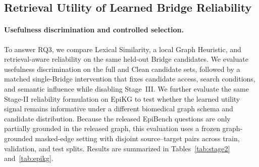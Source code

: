 \documentclass{article} %
\begin{document}
\subsection{Retrieval Utility of Learned Bridge Reliability}
\label{sec:stage2_eval}

\paragraph{Usefulness discrimination and controlled selection.}
To answer RQ3, we compare Lexical Similarity, a local Graph Heuristic, and
retrieval-aware reliability on the same held-out Bridge candidates. We evaluate
usefulness discrimination on the full and Clean candidate sets, followed by a
matched single-Bridge intervention that fixes candidate access, search conditions,
and semantic influence while disabling Stage~III. We further evaluate the same
Stage-II reliability formulation on EpiKG to test whether the learned utility signal
remains informative under a different biomedical graph schema and candidate
distribution. Because the released EpiBench questions are only partially grounded
in the released graph, this evaluation uses a frozen graph-grounded masked-edge
setting with disjoint source--target pairs across train, validation, and test splits.
Results are summarized in Tables~\ref{tab:stage2} and~\ref{tab:epikg}.

\begin{table}[H]
\centering
\vspace{-2mm}
\caption{Stage-II Bridge usefulness and controlled retrieval.}
\label{tab:stage2}
\vspace{-1mm}


\vspace{-2mm}
\end{table}
\end{document}
